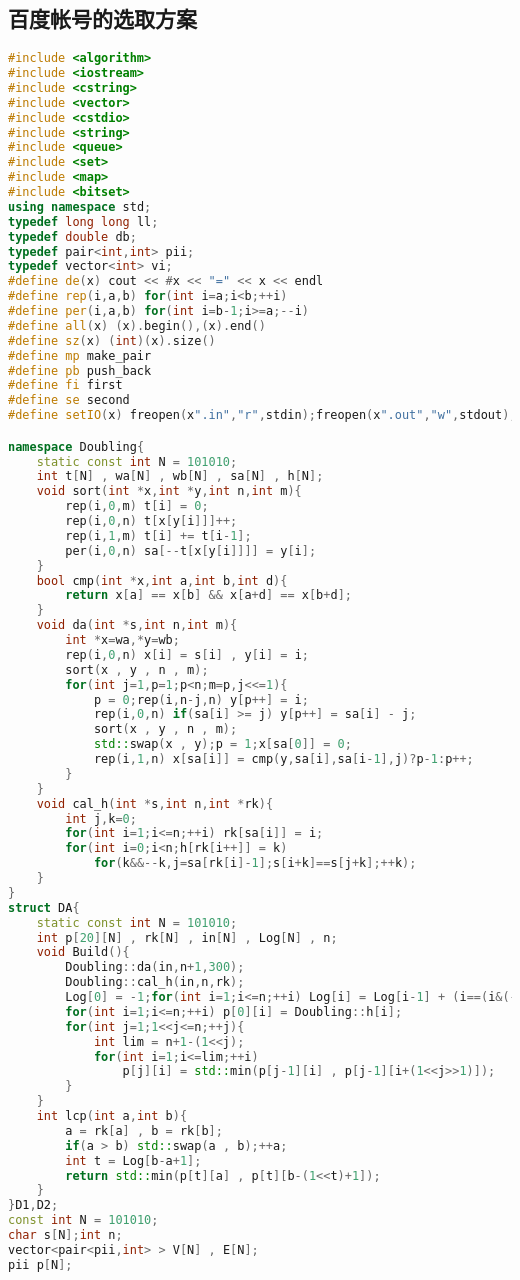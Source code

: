\subsection{百度帐号的选取方案}
\begin{lstlisting}[language=C++]
#include <algorithm>
#include <iostream>
#include <cstring>
#include <vector>
#include <cstdio>
#include <string>
#include <queue>
#include <set>
#include <map>
#include <bitset>
using namespace std;
typedef long long ll;
typedef double db;
typedef pair<int,int> pii;
typedef vector<int> vi;
#define de(x) cout << #x << "=" << x << endl
#define rep(i,a,b) for(int i=a;i<b;++i)
#define per(i,a,b) for(int i=b-1;i>=a;--i)
#define all(x) (x).begin(),(x).end()
#define sz(x) (int)(x).size()
#define mp make_pair
#define pb push_back
#define fi first
#define se second
#define setIO(x) freopen(x".in","r",stdin);freopen(x".out","w",stdout);

namespace Doubling{
    static const int N = 101010;
    int t[N] , wa[N] , wb[N] , sa[N] , h[N];
    void sort(int *x,int *y,int n,int m){
        rep(i,0,m) t[i] = 0;
        rep(i,0,n) t[x[y[i]]]++;
        rep(i,1,m) t[i] += t[i-1];
        per(i,0,n) sa[--t[x[y[i]]]] = y[i];
    }
    bool cmp(int *x,int a,int b,int d){
        return x[a] == x[b] && x[a+d] == x[b+d];
    }
    void da(int *s,int n,int m){
        int *x=wa,*y=wb;
        rep(i,0,n) x[i] = s[i] , y[i] = i;
        sort(x , y , n , m);
        for(int j=1,p=1;p<n;m=p,j<<=1){
            p = 0;rep(i,n-j,n) y[p++] = i;
            rep(i,0,n) if(sa[i] >= j) y[p++] = sa[i] - j;
            sort(x , y , n , m);
            std::swap(x , y);p = 1;x[sa[0]] = 0;
            rep(i,1,n) x[sa[i]] = cmp(y,sa[i],sa[i-1],j)?p-1:p++;
        }
    }
    void cal_h(int *s,int n,int *rk){
        int j,k=0;
        for(int i=1;i<=n;++i) rk[sa[i]] = i;
        for(int i=0;i<n;h[rk[i++]] = k)
            for(k&&--k,j=sa[rk[i]-1];s[i+k]==s[j+k];++k);
    }
}
struct DA{
    static const int N = 101010;
    int p[20][N] , rk[N] , in[N] , Log[N] , n;
    void Build(){
        Doubling::da(in,n+1,300);
        Doubling::cal_h(in,n,rk);
        Log[0] = -1;for(int i=1;i<=n;++i) Log[i] = Log[i-1] + (i==(i&(-i)));
        for(int i=1;i<=n;++i) p[0][i] = Doubling::h[i];
        for(int j=1;1<<j<=n;++j){
            int lim = n+1-(1<<j);
            for(int i=1;i<=lim;++i)
                p[j][i] = std::min(p[j-1][i] , p[j-1][i+(1<<j>>1)]);
        }
    }
    int lcp(int a,int b){
        a = rk[a] , b = rk[b];
        if(a > b) std::swap(a , b);++a;
        int t = Log[b-a+1];
        return std::min(p[t][a] , p[t][b-(1<<t)+1]);
    }
}D1,D2;
const int N = 101010;
char s[N];int n;
vector<pair<pii,int> > V[N] , E[N];
pii p[N];


\end{lstlisting}
